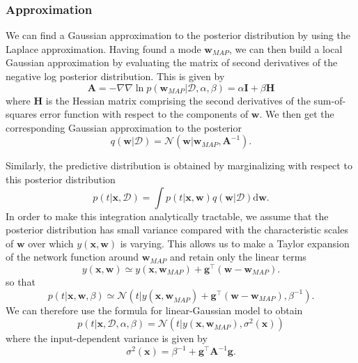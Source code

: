 \documentclass[a4paper]{report}
\newcommand{\ud}{\mathrm{d}}
\renewcommand{\bf}{\mathbf}
\renewcommand{\cal}{\mathcal}
\begin{document}
\subsubsection{Approximation}
We can find a Gaussian approximation to the posterior distribution by using the Laplace approximation. Having found a mode $\bf{w}_{MAP}$, we can then build a local Gaussian approximation by evaluating the matrix of second derivatives of the negative log posterior distribution. This is given by
\begin{equation}
	\bf{A} = -\nabla\nabla \ln p(\bf{w}_{MAP}|\cal{D},\alpha,\beta) = \alpha \bf{I} + \beta \bf{H}
\end{equation}
where $\bf{H}$ is the Hessian matrix comprising the second derivatives of the sum-of-squares error function with respect to the components of $\bf{w}$. We then get the corresponding Gaussian approximation to the posterior
\begin{equation}
	q(\bf{w}|\cal{D}) = \cal{N}(\bf{w}|\bf{w}_{MAP},\bf{A}^{-1}).
\end{equation}

Similarly, the predictive distribution is obtained by marginalizing with respect to this posterior distribution
\begin{equation}
	p(t|\bf{x},\cal{D}) = \int p(t|\bf{x,w})q(\bf{w}|\cal{D}) \ud \bf{w}.
\end{equation}
In order to make this integration analytically tractable, we assume that the posterior distribution has small variance compared with the characteristic scales of $\bf{w}$ over which $y(\bf{x,w})$ is varying. This allows us to make a Taylor expansion of the network function around $\bf{w}_{MAP}$ and retain only the linear terms
\begin{equation}
	y(\bf{x,w}) \simeq y(\bf{x},\bf{w}_{MAP}) + \bf{g}^{\intercal} (\bf{w}-\bf{w}_{MAP}).
\end{equation}
so that
\begin{equation}
	p(t|\bf{x,w},\beta) \simeq \cal{N}(t|y(\bf{x,w}_{MAP})+\bf{g}^{\intercal} (\bf{w-w}_{MAP}),\beta^{-1}).
\end{equation}
We can therefore use the formula for linear-Gaussian model to obtain
\begin{equation}
	p(t|\bf{x},\cal{D},\alpha,\beta) = \cal{N}(t|y(\bf{x},\bf{w}_{MAP}),\sigma^2(\bf{x}))
\end{equation}
where the input-dependent variance is given by
\begin{equation}
	\sigma^2(\bf{x}) = \beta^{-1} + \bf{g}^{\intercal} \bf{A}^{-1}\bf{g}.
\end{equation}
\end{document}
